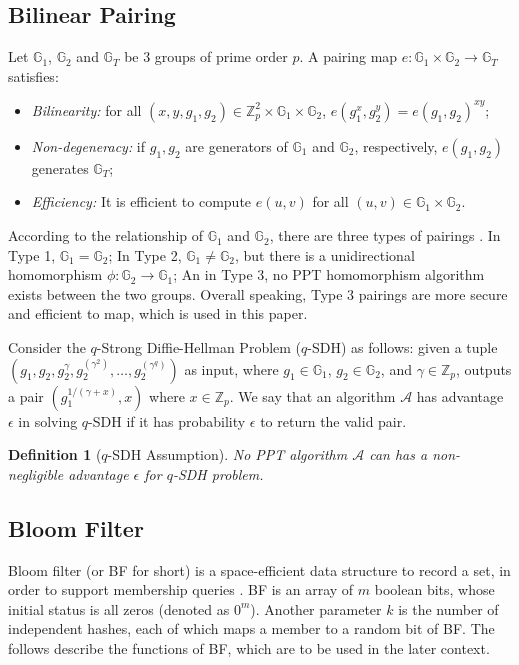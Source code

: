 \documentclass[conference]{IEEEtran}
\newtheorem{definition}{Definition}
\begin{document}
\subsection{Bilinear Pairing}
Let $\mathbb{G}_1$, $\mathbb{G}_2$ and $\mathbb{G}_T$ be 3 groups of prime order $p$. A pairing map $e:\mathbb{G}_1\times \mathbb{G}_2\rightarrow\mathbb{G}_T$ satisfies:
\begin{itemize}
	\item \textit{Bilinearity:} for all $(x,y, g_1, g_2) \in \mathbb{Z}_p^2\times \mathbb{G}_1\times \mathbb{G}_2$, $e(g_1^x, g_2^y) = e(g_1, g_2)^{xy}$;
	\item \textit{Non-degeneracy:} if $g_1, g_2$ are generators of $\mathbb{G}_1$ and $\mathbb{G}_2$, respectively, $e(g_1, g_2)$ generates $\mathbb{G}_T$;
	\item \textit{Efficiency:} It is efficient to compute $e(u,v)$ for all $(u, v) \in \mathbb{G}_1\times \mathbb{G}_2$.
\end{itemize}

According to the relationship of $\mathbb{G}_1$ and $\mathbb{G}_2$, there are three types of pairings \cite{GALBRAITH20083113}. 
In Type 1, $\mathbb{G}_1 = \mathbb{G}_2$; In Type 2, $\mathbb{G}_1 \neq \mathbb{G}_2$, but there is a unidirectional homomorphism $\phi:\mathbb{G}_2 \rightarrow \mathbb{G}_1$; An in Type 3, no PPT homomorphism algorithm exists between the two groups.
Overall speaking, Type 3 pairings are more secure and efficient to map, which is used in this paper.

Consider the $q$-Strong Diffie-Hellman Problem ($q$-SDH) as follows: given a tuple $(g_1, g_2, g_2^{\gamma}, g_2^{(\gamma^2)}, \dots, g_2^{(\gamma^q)})$ as input, where $g_1\in\mathbb{G}_1$, $g_2\in\mathbb{G}_2$, and $\gamma\in \mathbb{Z}_p$, outputs a pair $(g_1^{1/(\gamma + x)}, x)$ where $x \in \mathbb{Z}_p$. We say that an algorithm $\mathcal{A}$ has advantage $\epsilon$ in solving $q$-SDH if it has probability $\epsilon$ to return the valid pair.

\begin{definition}[$q$-SDH Assumption]
	No PPT algorithm $\mathcal{A}$ can has a non-negligible advantage $\epsilon$ for $q$-SDH problem.
\end{definition}


\subsection{Bloom Filter}
Bloom filter (or BF for short) is a space-efficient data structure to record a set, in order to support membership queries \cite{Bloom1970, broder2004network}.
BF is an array of $m$ boolean bits, whose initial status is all zeros (denoted as $0^m$). Another parameter $k$ is the number of independent hashes, each of which maps a member to a random bit of BF. The follows describe the functions of BF, which are to be used in the later context.
\end{document}

